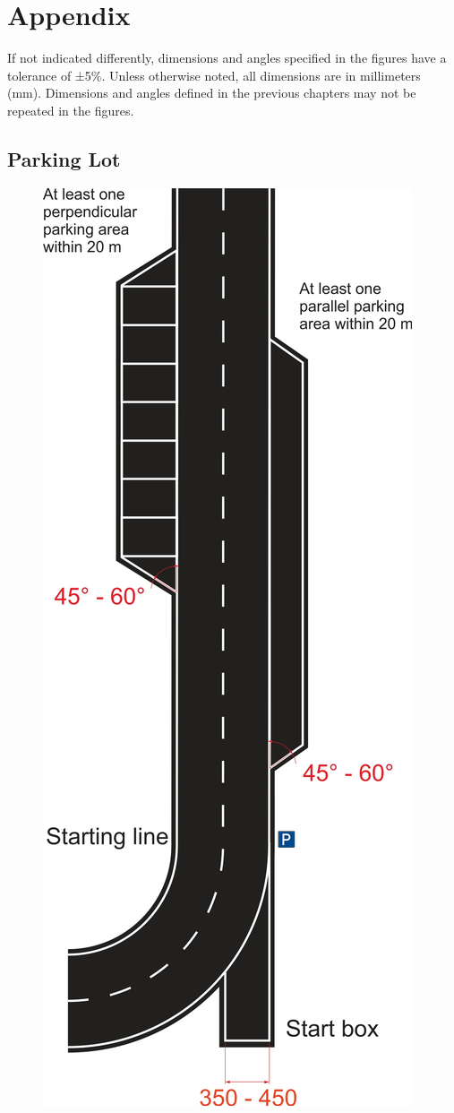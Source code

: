 \appendix
\chapter{Appendix}
If not indicated differently, dimensions and angles specified in the figures
have a tolerance of ±5\%. Unless otherwise noted, all dimensions are in
millimeters (mm). Dimensions and angles defined in the previous chapters may
not be repeated in the figures.

\section{Parking Lot}
\label{fig_parking_lot}
\begin{figure}[H]
	\begin{center}
		\centering\includegraphics[scale=0.8]{graphics/Abb_1_parking_lot.jpg}

\end{center}
\end{figure}
